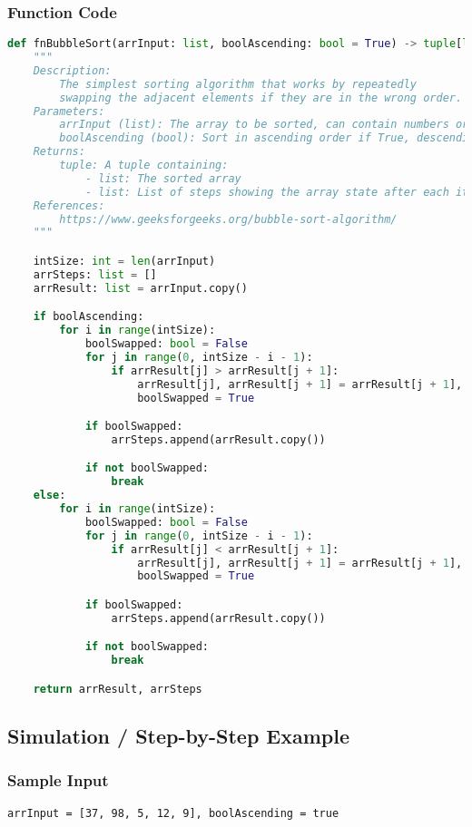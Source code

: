 \documentclass{article}
\begin{document}
\subsubsection*{Function Code}
\begin{lstlisting}[language=Python]
def fnBubbleSort(arrInput: list, boolAscending: bool = True) -> tuple[list, list]:
    """
    Description:
        The simplest sorting algorithm that works by repeatedly 
        swapping the adjacent elements if they are in the wrong order.
    Parameters:
        arrInput (list): The array to be sorted, can contain numbers or strings
        boolAscending (bool): Sort in ascending order if True, descending if False
    Returns: 
        tuple: A tuple containing:
            - list: The sorted array
            - list: List of steps showing the array state after each iteration
    References:
        https://www.geeksforgeeks.org/bubble-sort-algorithm/
    """

    intSize: int = len(arrInput)
    arrSteps: list = []
    arrResult: list = arrInput.copy()

    if boolAscending:
        for i in range(intSize):
            boolSwapped: bool = False
            for j in range(0, intSize - i - 1):
                if arrResult[j] > arrResult[j + 1]:
                    arrResult[j], arrResult[j + 1] = arrResult[j + 1], arrResult[j]
                    boolSwapped = True

            if boolSwapped:
                arrSteps.append(arrResult.copy())

            if not boolSwapped:
                break
    else:
        for i in range(intSize):
            boolSwapped: bool = False
            for j in range(0, intSize - i - 1):
                if arrResult[j] < arrResult[j + 1]:
                    arrResult[j], arrResult[j + 1] = arrResult[j + 1], arrResult[j]
                    boolSwapped = True

            if boolSwapped:
                arrSteps.append(arrResult.copy())

            if not boolSwapped:
                break

    return arrResult, arrSteps
\end{lstlisting}

\subsection*{Simulation / Step-by-Step Example}
\subsubsection*{Sample Input}
\texttt{arrInput = [37, 98, 5, 12, 9], boolAscending = true}
\end{document}
